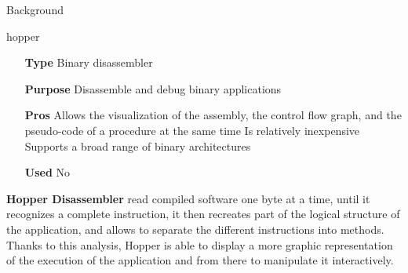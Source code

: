 \begin{chaptercover}{Background}
\begin{solutiondata}{hopper}
\begin{itemize}[labelsep=1cm]
  \item [\textbf{Type}] Binary disassembler
  \item [\textbf{Purpose}] Disassemble and debug binary applications
  \item [\textbf{Pros}] Allows the visualization of the assembly, the control flow graph, and the pseudo-code of a procedure at the same time \newline Is relatively inexpensive \newline Supports a broad range of binary architectures
  \item [\textbf{Used}] No
\end{itemize}
\end{solutiondata}

\textbf{Hopper Disassembler} \cite{hopper} read compiled software one byte at a time, until it recognizes a complete instruction, it then recreates part of the logical structure of the application, and allows to separate the different instructions into methods. Thanks to this analysis, Hopper is able to display a more graphic representation of the execution of the application and from there to manipulate it interactively.

\end{chaptercover}
